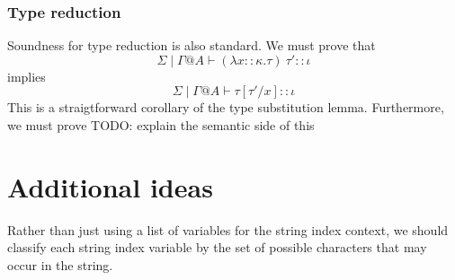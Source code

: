 \documentclass{article}
\begin{document}
\subsubsection*{Type reduction}

Soundness for type reduction is also standard. We must prove that $$\Sigma \mid \Gamma @ A \vdash (\lambda x :: \kappa. \tau)~\tau' :: \iota$$ implies $$\Sigma \mid \Gamma @ A \vdash \tau[\tau'/x] :: \iota$$ This is a straigtforward corollary of the type substitution lemma. Furthermore, we must prove
TODO: explain the semantic side of this

\section*{Additional ideas}

Rather than just using a list of variables for the string index context, we should classify each
string index variable by the set of possible characters that may occur in the string. 
 
\end{document}
